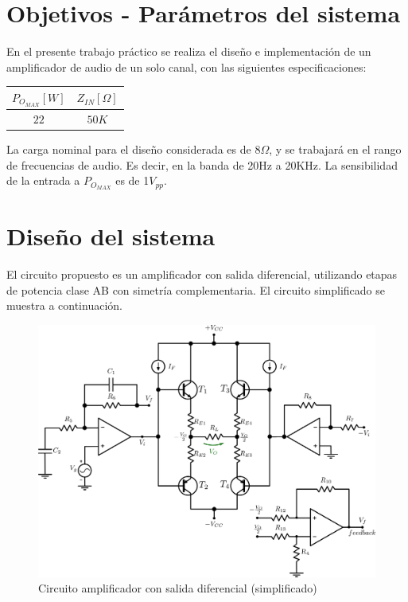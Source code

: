 



\tableofcontents
\newpage

\section{Objetivos - Parámetros del sistema}

En el presente trabajo práctico se realiza el diseño e implementación de un amplificador de audio de un solo canal, con las siguientes especificaciones:

\begin{center}
\begin{tabular}{|c|c|}
\hline 
$P_{O_{MAX}}[W]$ & $Z_{IN}[\Omega]$\\
\hline 
\hline 
$22$ & $50K$\\
\hline 
\end{tabular}
\end{center}

La carga nominal para el diseño considerada es de $8\Omega$, y se trabajará en el rango de frecuencias de audio. Es decir, en la banda de 20Hz a 20KHz. La sensibilidad de la entrada a $P_{O_{MAX}}$ es de 1$V_{pp}$.

\section{Diseño del sistema}

El circuito propuesto es un amplificador con salida diferencial, utilizando etapas de potencia clase AB con simetría complementaria. El circuito simplificado se muestra a continuación.

\begin{figure}[!ht]
\begin{centering}
\includegraphics[scale=0.45]{Imagenes/CompletoSimple.png}
\par\end{centering}
\caption{Circuito amplificador con salida diferencial (simplificado)}
\end{figure}


